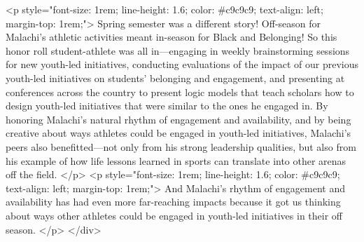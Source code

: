                 <p style="font-size: 1rem; line-height: 1.6; color: #c9c9c9; text-align: left; margin-top: 1rem;">
                    Spring semester was a different story! Off-season for Malachi’s athletic activities meant in-season for Black and Belonging! So this honor roll student-athlete was all in—engaging in weekly brainstorming sessions for new youth-led initiatives, conducting evaluations of the impact of our previous youth-led initiatives on students’ belonging and engagement, and presenting at conferences across the country to present logic models that teach scholars how to design youth-led initiatives that were similar to the ones he engaged in. By honoring Malachi’s natural rhythm of engagement and availability, and by being creative about ways athletes could be engaged in youth-led initiatives, Malachi’s peers also benefitted—not only from his strong leadership qualities, but also from his example of how life lessons learned in sports can translate into other arenas off the field.
                </p>
                <p style="font-size: 1rem; line-height: 1.6; color: #c9c9c9; text-align: left; margin-top: 1rem;">
                    And Malachi’s rhythm of engagement and availability has had even more far-reaching impacts because it got us thinking about ways other athletes could be engaged in youth-led initiatives in their off season.
                </p>
            </div>

